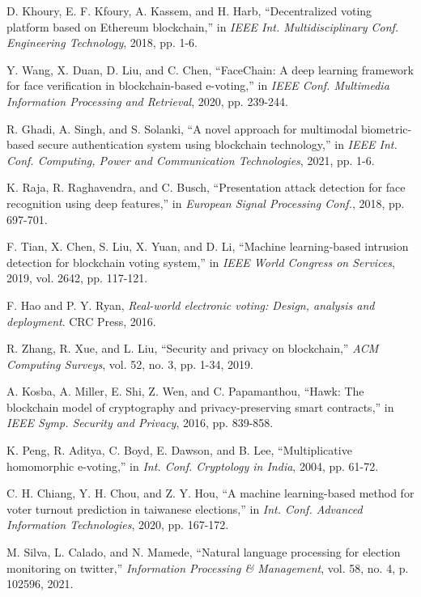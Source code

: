 \documentclass[conference]{IEEEtran}
\begin{document}
\begin{thebibliography}{20}
D. Khoury, E. F. Kfoury, A. Kassem, and H. Harb, ``Decentralized voting platform based on Ethereum blockchain,'' in {\it IEEE Int. Multidisciplinary Conf. Engineering Technology}, 2018, pp. 1-6.

Y. Wang, X. Duan, D. Liu, and C. Chen, ``FaceChain: A deep learning framework for face verification in blockchain-based e-voting,'' in {\it IEEE Conf. Multimedia Information Processing and Retrieval}, 2020, pp. 239-244.

R. Ghadi, A. Singh, and S. Solanki, ``A novel approach for multimodal biometric-based secure authentication system using blockchain technology,'' in {\it IEEE Int. Conf. Computing, Power and Communication Technologies}, 2021, pp. 1-6.

K. Raja, R. Raghavendra, and C. Busch, ``Presentation attack detection for face recognition using deep features,'' in {\it European Signal Processing Conf.}, 2018, pp. 697-701.

F. Tian, X. Chen, S. Liu, X. Yuan, and D. Li, ``Machine learning-based intrusion detection for blockchain voting system,'' in {\it IEEE World Congress on Services}, 2019, vol. 2642, pp. 117-121.

F. Hao and P. Y. Ryan, {\it Real-world electronic voting: Design, analysis and deployment}. CRC Press, 2016.

R. Zhang, R. Xue, and L. Liu, ``Security and privacy on blockchain,'' {\it ACM Computing Surveys}, vol. 52, no. 3, pp. 1-34, 2019.

A. Kosba, A. Miller, E. Shi, Z. Wen, and C. Papamanthou, ``Hawk: The blockchain model of cryptography and privacy-preserving smart contracts,'' in {\it IEEE Symp. Security and Privacy}, 2016, pp. 839-858.

K. Peng, R. Aditya, C. Boyd, E. Dawson, and B. Lee, ``Multiplicative homomorphic e-voting,'' in {\it Int. Conf. Cryptology in India}, 2004, pp. 61-72.

C. H. Chiang, Y. H. Chou, and Z. Y. Hou, ``A machine learning-based method for voter turnout prediction in taiwanese elections,'' in {\it Int. Conf. Advanced Information Technologies}, 2020, pp. 167-172.

M. Silva, L. Calado, and N. Mamede, ``Natural language processing for election monitoring on twitter,'' {\it Information Processing \& Management}, vol. 58, no. 4, p. 102596, 2021.
\end{thebibliography}
\end{document}

